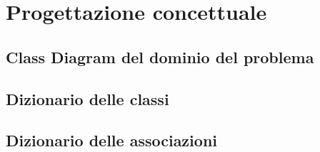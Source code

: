 \chapter{Progettazione concettuale}
    \section{Class Diagram del dominio del problema}
        
    \section{Dizionario delle classi}
        
    \section{Dizionario delle associazioni}